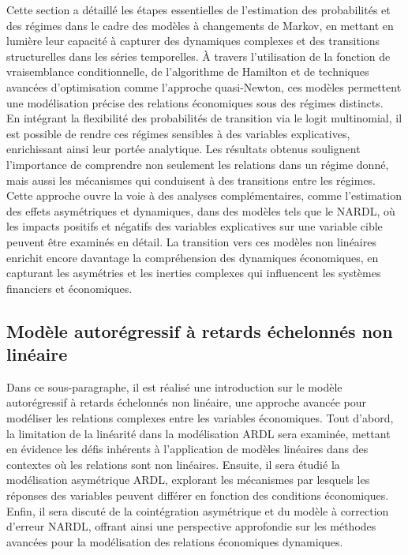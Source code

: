 \begin{sloppypar}
Cette section a détaillé les étapes essentielles de l'estimation des probabilités et des régimes dans le cadre des modèles à changements de Markov, en mettant en lumière leur capacité à capturer des dynamiques complexes et des transitions structurelles dans les séries temporelles. À travers l'utilisation de la fonction de vraisemblance conditionnelle, de l'algorithme de Hamilton et de techniques avancées d'optimisation comme l'approche quasi-Newton, ces modèles permettent une modélisation précise des relations économiques sous des régimes distincts.\\

En intégrant la flexibilité des probabilités de transition via le logit multinomial, il est possible de rendre ces régimes sensibles à des variables explicatives, enrichissant ainsi leur portée analytique. Les résultats obtenus soulignent l'importance de comprendre non seulement les relations dans un régime donné, mais aussi les mécanismes qui conduisent à des transitions entre les régimes.\\

Cette approche ouvre la voie à des analyses complémentaires, comme l'estimation des effets asymétriques et dynamiques, dans des modèles tels que le NARDL, où les impacts positifs et négatifs des variables explicatives sur une variable cible peuvent être examinés en détail. La transition vers ces modèles non linéaires enrichit encore davantage la compréhension des dynamiques économiques, en capturant les asymétries et les inerties complexes qui influencent les systèmes financiers et économiques.

\subsection{Modèle autorégressif à retards échelonnés non linéaire}

Dans ce sous-paragraphe, il est réalisé une introduction sur le modèle autorégressif à retards échelonnés non linéaire, une approche avancée pour modéliser les relations complexes entre les variables économiques. Tout d'abord, la limitation de la linéarité dans la modélisation ARDL sera examinée, mettant en évidence les défis inhérents à l'application de modèles linéaires dans des contextes où les relations sont non linéaires. Ensuite, il sera étudié la modélisation asymétrique ARDL, explorant les mécanismes par lesquels les réponses des variables peuvent différer en fonction des conditions économiques. Enfin, il sera discuté de la cointégration asymétrique et du modèle à correction d'erreur NARDL, offrant ainsi une perspective approfondie sur les méthodes avancées pour la modélisation des relations économiques dynamiques.


\end{sloppypar}
